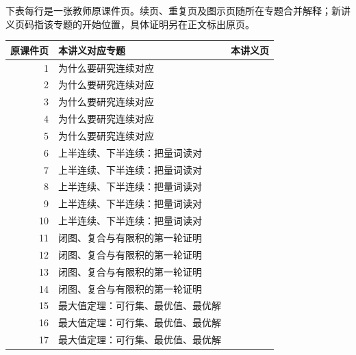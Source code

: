 \documentclass[11pt,a4paper]{article}
\theoremstyle{definition}\newtheorem{definition}{定义}\newtheorem{example}{例}
\begin{document}
下表每行是一张教师原课件页。续页、重复页及图示页随所在专题合并解释；新讲义页码指该专题的开始位置，具体证明另在正文标出原页。

\begin{longtable}{r p{.66\linewidth} r}\toprule 原课件页&本讲义对应专题&本讲义页\\\midrule\endhead

1 & 为什么要研究连续对应 & \pageref{g:108:1}\\

2 & 为什么要研究连续对应 & \pageref{g:108:1}\\

3 & 为什么要研究连续对应 & \pageref{g:108:1}\\

4 & 为什么要研究连续对应 & \pageref{g:108:1}\\

5 & 为什么要研究连续对应 & \pageref{g:108:1}\\

6 & 上半连续、下半连续：把量词读对 & \pageref{g:108:6}\\

7 & 上半连续、下半连续：把量词读对 & \pageref{g:108:6}\\

8 & 上半连续、下半连续：把量词读对 & \pageref{g:108:6}\\

9 & 上半连续、下半连续：把量词读对 & \pageref{g:108:6}\\

10 & 上半连续、下半连续：把量词读对 & \pageref{g:108:6}\\

11 & 闭图、复合与有限积的第一轮证明 & \pageref{g:108:11}\\

12 & 闭图、复合与有限积的第一轮证明 & \pageref{g:108:11}\\

13 & 闭图、复合与有限积的第一轮证明 & \pageref{g:108:11}\\

14 & 闭图、复合与有限积的第一轮证明 & \pageref{g:108:11}\\

15 & 最大值定理：可行集、最优值、最优解 & \pageref{g:108:15}\\

16 & 最大值定理：可行集、最优值、最优解 & \pageref{g:108:15}\\

17 & 最大值定理：可行集、最优值、最优解 & \pageref{g:108:15}\\


\end{longtable}
\end{document}
